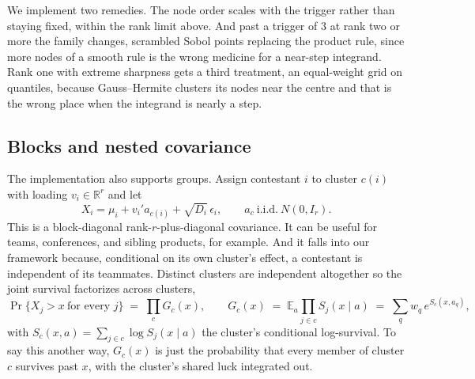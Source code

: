 \documentclass[11pt]{article}
\newcommand{\R}{\mathbb{R}}
\newcommand{\E}{\mathbb{E}}
\begin{document}
We implement two remedies. The node order scales with the trigger rather
than staying fixed, within the rank limit above. And past a trigger of
$3$ at rank two or more the
family changes, scrambled Sobol points replacing the product rule, since
more nodes of a smooth rule is the wrong medicine for a near-step
integrand. Rank one with extreme sharpness gets a third treatment, an
equal-weight grid on quantiles, because Gauss--Hermite clusters its nodes
near the centre and that is the wrong place when the integrand is nearly
a step.


\subsection{Blocks and nested covariance}\label{sec:blocks}

The implementation also supports groups. Assign contestant $i$ to cluster $c(i)$ with loading $v_i\in\R^r$ and let
\begin{equation}
X_i=\mu_i+v_i'a_{c(i)}+\sqrt{D_i}\,\epsilon_i,
\qquad a_c \ \text{i.i.d.}\ N(0,I_r).
\end{equation}
This is a block-diagonal rank-$r$-plus-diagonal covariance. It can be useful for teams, conferences, and sibling
products, for example. And it falls into our framework because, conditional on its own cluster's effect, a contestant is independent of its teammates. Distinct clusters are
independent altogether so the joint survival factorizes across clusters,
\begin{equation}\label{eq:blockfield}
\Pr\{X_j>x\ \text{for every } j\} \;=\; \prod_c G_c(x),
\qquad
G_c(x)\;=\;\E_a \prod_{j\in c} S_j(x\mid a)
       \;=\;\sum_q w_q\, e^{S_c(x,a_q)},
\end{equation}
with $S_c(x,a)=\sum_{j\in c}\log S_j(x\mid a)$ the cluster's conditional
log-survival. To say this another way, $G_c(x)$ is just the probability that every member of
cluster $c$ survives past $x$, with the cluster's shared luck integrated out.
\end{document}
